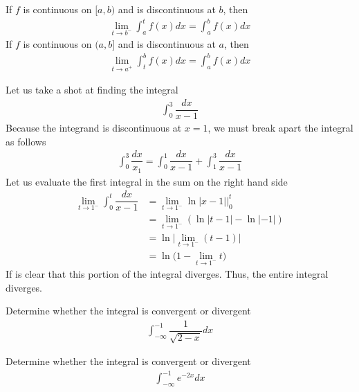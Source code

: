 \begin{definition}
If $f$ is continuous on $[a, b)$ and is discontinuous at $b$, then 
\begin{align*}
    \lim_{t \longrightarrow b^{-}} \int_{a}^{t} f(x) dx = \int_{a}^{b} f(x) dx
\end{align*}
If $f$ is continuous on $(a, b]$ and is discontinuous at $a$, then 
\begin{align*}
    \lim_{t \longrightarrow a^{+}} \int_{t}^{b} f(x) dx = \int_{a}^{b} f(x) dx
\end{align*}
\end{definition}

\begin{example}
Let us take a shot at finding the integral
\begin{align*}
    \int_{0}^{3} \dfrac{dx}{x - 1}
\end{align*}
Because the integrand is discontinuous at $x = 1$, we must break apart the integral as follows
\begin{align*}
    \int_{0}^{3} \dfrac{dx}{x_1} = \int_{0}^{1} \dfrac{dx}{x-1} + \int_{1}^{3} \dfrac{dx}{x-1} 
\end{align*}
Let us evaluate the first integral in the sum on the right hand side
\begin{align*}
    \lim_{t \longrightarrow 1^{-}} \int_{0}^{t} \dfrac{dx}{x-1} &= \lim_{t \longrightarrow 1^{-}} \ln \lvert x - 1 \rvert \Big|_{0}^{t}\\[2ex]
    &= \lim_{t \longrightarrow 1^{-}} (\ln \lvert t - 1 \rvert - \ln \lvert -1 \rvert)\\[2ex]
    &= \ln \Big\lvert \lim_{t \longrightarrow 1^{-}} (t - 1) \Big\rvert\\[2ex]
    &= \ln \Big(1 - \lim_{t \longrightarrow 1^{-}} t \Big)
\end{align*}
If is clear that this portion of the integral diverges. Thus, the entire integral diverges. 
\end{example}

\begin{example}
Determine whether the integral is convergent or divergent
\begin{align*}
    \int_{-\infty}^{-1} \dfrac{1}{\sqrt{2-x}} dx
\end{align*}
\end{example}

\begin{example}
Determine whether the integral is convergent or divergent
\begin{align*}
    \int_{-\infty}^{-1} e^{-2x} dx
\end{align*}
\end{example}

